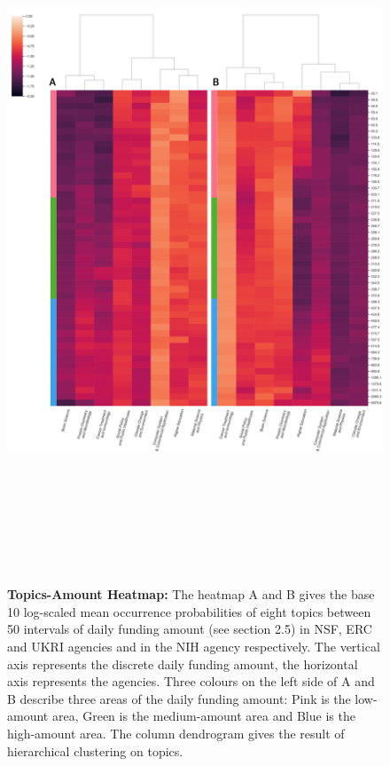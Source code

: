 \begin{figure}[H]
    \centering
    \includegraphics[width = 16cm, height = 21cm]{Code/img/heatmap_amount_topics.pdf}
    \caption[Heatmaps between topics and 50 intervals of discrete funding amount]{\textbf{Topics-Amount Heatmap:} The heatmap A and B gives the base 10 log-scaled mean occurrence probabilities of eight topics between 50 intervals of daily funding amount (see section 2.5) in NSF, ERC and UKRI agencies and in the NIH agency respectively. The vertical axis represents the discrete daily funding amount, the horizontal axis represents the agencies. Three colours on the left side of A and B describe three areas of the daily funding amount: Pink is the low-amount area, Green is the medium-amount area and Blue is the high-amount area. The column dendrogram gives the result of hierarchical clustering on topics.}
\end{figure}

